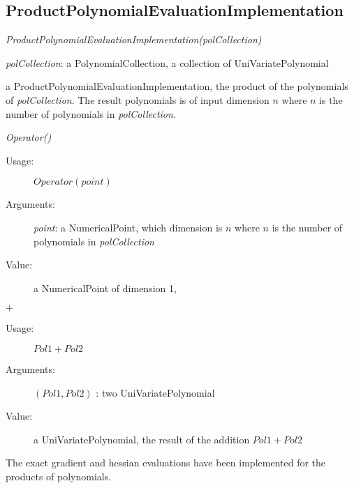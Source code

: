 
\newpage
\subsection{ProductPolynomialEvaluationImplementation}

\begin{description}

\item[Usage:] \textit{ProductPolynomialEvaluationImplementation(polCollection)}

\item[Arguments:]  \textit{polCollection}: a PolynomialCollection, a collection of UniVariatePolynomial

\item[Value:] a ProductPolynomialEvaluationImplementation, the product of the polynomials of \textit{polCollection}. The result polynomials is of input dimension $n$ where $n$ is the number of polynomials in  \textit{polCollection}.

\item[Some methods :]  \rule{0pt}{1em}

\item \textit{Operator()}
\begin{description}
\item[Usage:]  $Operator(point)$
\item[Arguments:] \textit{point}: a NumericalPoint, which dimension is $n$ where $n$ is the number of polynomials in  \textit{polCollection}
\item[Value:] a NumericalPoint of dimension 1,
\end{description}
\bigskip

\item $+$
\begin{description}
\item[Usage:]  $Pol1+Pol2$
\item[Arguments:] $(Pol1, Pol2)$ : two UniVariatePolynomial
\item[Value:] a UniVariatePolynomial, the result of the addition  $Pol1+Pol2$
\end{description}


\item[Details:]  The exact gradient and hessian evaluations have been implemented for the products of polynomials.

\end{description}

